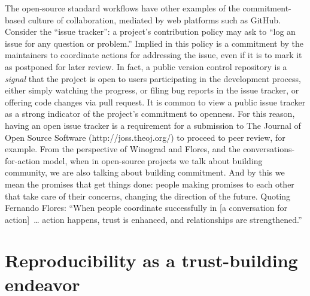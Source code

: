\documentclass{statement}
\newlength{\up}
\begin{document}
The open-source standard workflows have other examples of the commitment-based culture of collaboration, mediated by web platforms such as GitHub. 
Consider the ``issue tracker'': a project's contribution policy may ask to ``log an issue for any question or problem.'' 
Implied in this policy is a commitment by the maintainers to coordinate actions for addressing the issue, even if it is to mark it as postponed for later review. 
In fact, a public version control repository is a \emph{signal} that the project is open to users participating in the development process, either simply watching the progress, or filing bug reports in the issue tracker, or offering code changes via pull request. 
It is common to view a public issue tracker as a strong indicator of the project's commitment to openness. 
For this reason, having an open issue tracker is a requirement for a submission to The Journal of Open Source Software (http://joss.theoj.org/) to proceed to peer review, for example. 
From the perspective of Winograd and Flores, and the conversations-for-action model, when in open-source projects we talk about building community, we are also talking about building commitment. 
And by this we mean the promises that get things done: people making promises to each other that take care of their concerns, changing the direction of the future. 
Quoting Fernando Flores: ``When people coordinate successfully in [a conversation for action] … action happens, trust is enhanced, and relationships are strengthened.''

\section*{Reproducibility as a trust-building endeavor}
\vspace{\up}
\end{document}
